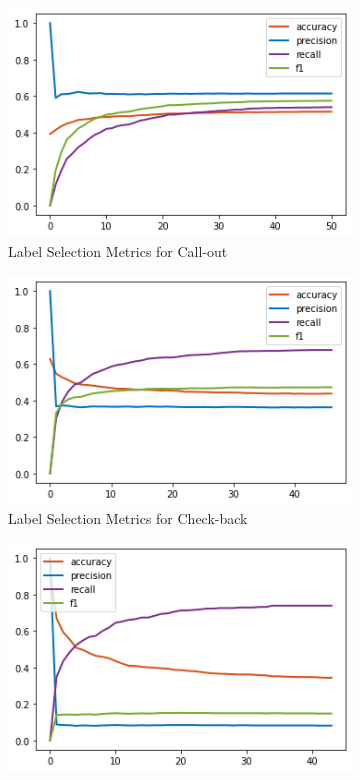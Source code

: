 \documentclass[11pt]{article}
\begin{document}
\captionsetup[subfigure]{width=1.25\textwidth}
\begin{figure}
  \centering
  \begin{subfigure}{0.32\textwidth}
    \includegraphics[width=\linewidth]{callout.png}
    \caption{Label Selection Metrics for Call-out}
    \label{fig:plot1}
  \end{subfigure}
  \hfill
  \begin{subfigure}{0.32\textwidth}
    \includegraphics[width=\linewidth]{checkback.png}
    \caption{Label Selection Metrics for Check-back}
    \label{fig:plot2}
  \end{subfigure}
  \hfill
  \begin{subfigure}{0.32\textwidth}
    \includegraphics[width=\linewidth]{closing.png}

\end{subfigure}
\end{figure}
\end{document}

